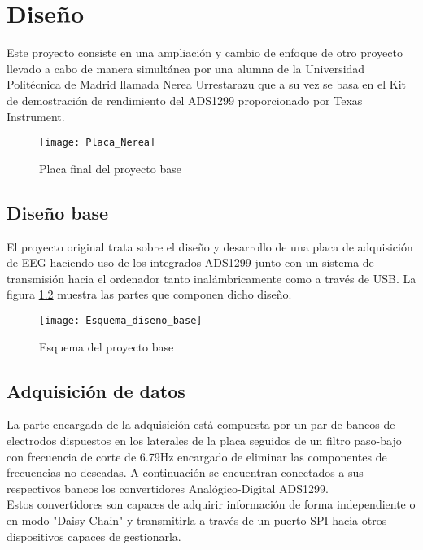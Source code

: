 \chapter{Diseño\label{sec:diseño}}

Este proyecto consiste en una ampliación y cambio de enfoque de otro proyecto llevado a cabo de manera simultánea por una alumna de la Universidad Politécnica de Madrid llamada Nerea Urrestarazu que a su vez se basa en el Kit de demostración de rendimiento del ADS1299 proporcionado por Texas Instrument.

\begin{figure} [H]
    \centering
    \texttt{[image: Placa\_Nerea]}
    \caption{Placa final del proyecto base}
    \label{fig:Placa_base}
\end{figure}

\section{Diseño base\label{sec:Diseno_base_N}}

El proyecto original trata sobre el diseño y desarrollo de una placa de adquisición de EEG haciendo uso de los integrados ADS1299 junto con un sistema de transmisión hacia el ordenador tanto inalámbricamente como a través de USB. La figura \ref{fig:Diseno_base} muestra las partes que componen dicho diseño.

\begin{figure} [H]
    \centering
    \texttt{[image: Esquema\_diseno\_base]}
    \caption{Esquema del proyecto base}
    \label{fig:Diseno_base}
\end{figure}

\section{Adquisición de datos\label{sec:Adquisicion_N}}

La parte encargada de la adquisición está compuesta por un par de bancos de electrodos dispuestos en los laterales de la placa seguidos de un filtro paso-bajo con frecuencia de corte de 6.79Hz encargado de eliminar las componentes de frecuencias no deseadas. A continuación se encuentran conectados a sus respectivos bancos los convertidores Analógico-Digital ADS1299. 
\\Estos convertidores son capaces de adquirir información de forma independiente o en modo "Daisy Chain" y transmitirla a través de un puerto \gls{SPI} hacia otros dispositivos capaces de gestionarla.

